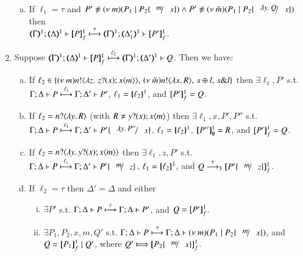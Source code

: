 \begin{proposition}
\begin{enumerate}[1.]
\begin{enumerate}[a)]
			\item If $\ell_1 = \tau$
			and $P' \not\scong \news{m}(P_1 \Par P_2\subst{m}{x}) \land P' \not\scong \news{\tilde{m}}(P_1 \Par P_2\subst{\abs{y}Q}{x})$
			then \\
			$\stytra{\mapt{\Gamma}^{1}}{\tau}{\mapt{\Delta}^{1}}{\pmapp{P}{1}{f}}{\mapt{\Delta'_1}^{1}}{ \pmapp{P'}{1}{f}
			}$.
			\end{enumerate}
			
		\item Suppose $\stytra{\mapt{\Gamma}^{1}}{\ell_2}{\mapt{\Delta}^{1}}{\pmapp{P}{1}{f}}{\mapt{\Delta'}^{1}}{Q}$.
		Then we have:
			\begin{enumerate}[a)]
		    \item 
		    If $\ell_2 \in \{\news{m}\bactout{n}{\abs{z}{\,\binp{z}{x} \appl{x}{m}}}, \,\news{\tilde{m}}\bactout{n}{\abs{x}R}, \,\bactsel{s}{l}, \,\bactbra{s}{l}   \}$
			then $\exists \ell_1, P'$ s.t. \\
			$\stytra{ \Gamma }{\ell_1}{ \Delta }{ P}{ \Delta' }{ P'}$, 
			$\ell_1 = \mapa{\ell_2}^{1}$, 
			and
			$\map{P'}^{1}_f = Q$.
			
			\item 
		    If $\ell_2 = \bactinp{n}{\abs{y}R}$ (with $R \neq \binp{y}{x} \appl{x}{m}$)
			then $\exists \ell_1, x, P', P''$ s.t. \\
			$\stytra{ \Gamma }{\ell_1}{ \Delta }{ P}{ \Delta' }{ P'\subst{\abs{y}P''}{x}}$, 
			$\ell_1 = \mapa{\ell_2}^{1}$, 
						$\map{P''}^{1}_\es = R$, and 			$\map{P'}^{1}_f = Q$.		
						
			\item 
		    If $\ell_2 = \bactinp{n}{\abs{y}\binp{y}{x} \appl{x}{m}}$ 
			then $\exists \ell_1, z, P'$ s.t. \\
			$\stytra{ \Gamma }{\ell_1}{ \Delta }{ P}{ \Delta' }{ P'\subst{m}{z}}$, 
			$\ell_1 = \mapa{\ell_2}^{1}$,
			and 
			$Q \by{\tau}_3  \map{P'\subst{m}{z}}^{1}_f$.	
		
			
			\item 
		    If $\ell_2 = \tau$ 
			then $\Delta' = \Delta$ and 
			either
			\begin{enumerate}[(i)]
			\item $\exists P'$ s.t. 
			$\stytra{ \Gamma }{\tau}{ \Delta }{ P}{ \Delta}{ P'}$, and $Q = \map{P'}^{1}_f$.	

			\item $\exists P_1, P_2, x, m, Q'$ s.t. 
			$\stytra{ \Gamma }{\tau}{ \Delta }{ P}{ \Delta}{\news{m}( P_1 \Par P_2\subst{m}{x}) }$, and 
			$Q = \map{P_1}^{1}_f \Par Q'$, where $Q'  \Hby{} \map{P_2\subst{m}{x}}^{1}_f$.


\end{enumerate}
\end{enumerate}
\end{enumerate}
\end{proposition}
